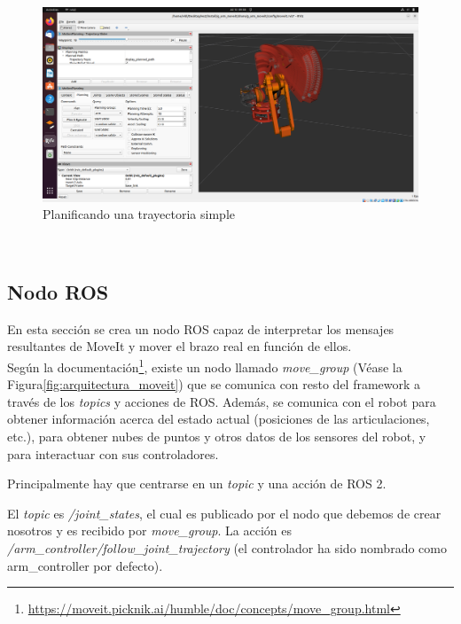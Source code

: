 \begin{figure} [ht!]
    \begin{center}
      \includegraphics[width=15cm]{figs/moveit_demo_trajectory.png}
    \end{center}
    \caption{Planificando una trayectoria simple}
    \label{fig:moveit_trayectory_demo}
\end{figure}\ 
\\
\newpage
\subsection{Nodo ROS}
\noindent En esta sección se crea un nodo ROS capaz de interpretar los mensajes resultantes de MoveIt y mover el brazo real en función de ellos.
\\

Según la documentación\footnote{\url{https://moveit.picknik.ai/humble/doc/concepts/move_group.html}}, existe un nodo llamado 
\textit{move\_group} (Véase la Figura\ref{fig:arquitectura_moveit}) que se comunica con resto del framework 
a través de los \textit{topics} y acciones de ROS. Además, se comunica con el robot para obtener información acerca del estado 
actual (posiciones de las articulaciones, etc.), para obtener nubes de puntos y otros datos de los sensores del 
robot, y para interactuar con sus controladores.

Principalmente hay que centrarse en un \textit{topic} y una acción de ROS 2. 

El \textit{topic} es \textit{/joint\_states}, el cual es publicado por el nodo que debemos de crear nosotros 
y es recibido por \textit{move\_group}. La acción es \textit{/arm\_controller/follow\_joint\_trajectory} (el controlador ha sido nombrado como 
arm\_controller por defecto). 



